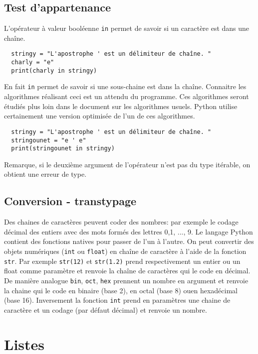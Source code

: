 \subsection{Test d'appartenance}
L'opérateur à valeur booléenne \texttt{in} permet de savoir si un caractère est dans une chaîne.
\begin{verbatim}
  stringy = "L'apostrophe ' est un délimiteur de chaîne. "
  charly = "e"
  print(charly in stringy)\end{verbatim}
En fait \texttt{in} permet de savoir si une sous-chaine est dans la chaîne. Connaitre les algorithmes réalisant ceci est un attendu du programme. Ces algorithmes seront étudiés plus loin dans le document sur les algorithmes usuels. Python utilise certainement une version optimisée de l'un de ces algorithmes.   
\begin{verbatim}
  stringy = "L'apostrophe ' est un délimiteur de chaîne. "
  stringounet = "e ' e"
  print(stringounet in stringy)\end{verbatim}
Remarque, si le deuxième argument de l'opérateur n'est pas du type itérable, on obtient une erreur de type.

\subsection{Conversion - transtypage}
Des chaines de caractères peuvent coder des nombres: par exemple le codage décimal des entiers avec des mots formés des lettres 0,1, ..., 9. Le langage Python contient des fonctions natives pour passer de l'un à l'autre.\newline
On peut convertir des objets numériques (\texttt{int} ou \texttt{float}) en chaîne de caractère à l'aide de la fonction \texttt{str}. Par exemple \texttt{str(12)} et \texttt{str(1.2)} prend respectivement un entier ou un float comme paramètre et renvoie la chaîne de caractères qui le code en décimal. De manière analogue \texttt{bin}, \texttt{oct}, \texttt{hex} prennent un nombre en argument et renvoie la chaine qui le code en binaire (base 2), en octal (base 8) ouen hexadécimal (base 16).\newline
Inversement la fonction \texttt{int} prend en paramètres une chaine de caractère et un codage (par défaut décimal) et renvoie un nombre. 

\section{Listes}
